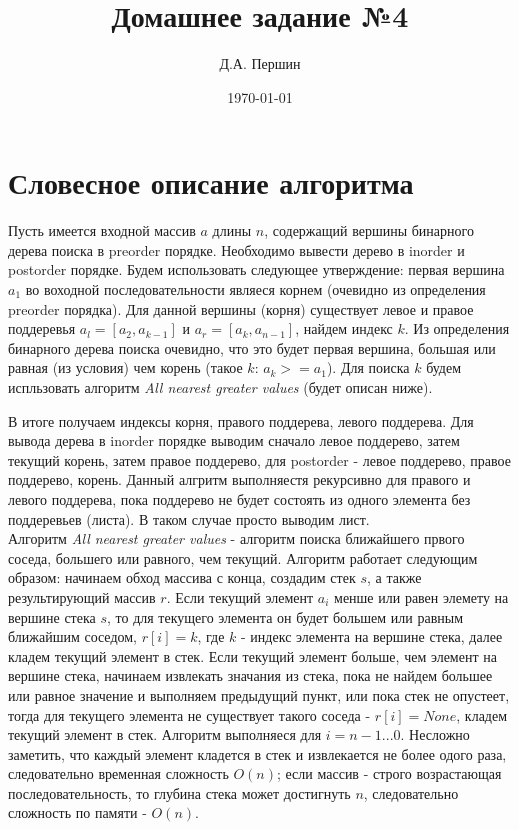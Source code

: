 \documentclass[12pt]{article}
\title{\bf Домашнее задание №4}
\author{Д.А. Першин}
\date{\today}
\begin{document}
\maketitle


\section{Словесное описание алгоритма}

Пусть имеется входной массив $a$ длины $n$, содержащий вершины бинарного дерева поиска в preorder порядке. Необходимо вывести дерево в inorder и postorder порядке. Будем использовать следующее утверждение: первая вершина $a_1$ во воходной последовательности являеся корнем (очевидно из определения preorder порядка). Для данной вершины (корня) существует левое и правое поддеревья $a_l = [a_2,a_{k-1}]$ и $a_r = [a_k, a_{n-1}]$, найдем индекс $k$. Из определения бинарного дерева поиска очевидно, что это будет первая вершина, большая или равная (из условия) чем корень (такое $k$: $a_k >= a_1$). Для поиска $k$ будем испльзовать алгоритм \emph{All nearest greater values} (будет описан ниже).

В итоге получаем индексы корня, правого поддерева, левого поддерева. Для вывода дерева в inorder порядке выводим сначало левое поддерево, затем текущий корень, затем правое поддерево, для postorder - левое поддерево, правое поддерево, корень. Данный алгритм выполняестя рекурсивно для правого и левого поддерева, пока поддерево не будет состоять из одного элемента без поддеревьев (листа). В таком случае просто выводим лист.\\

Алгоритм \emph{All nearest greater values} - алгоритм поиска ближайшего првого соседа, большего или равного, чем текущий. Алгоритм работает следующим образом: начинаем обход массива с конца, создадим стек $s$, а также результирующий массив $r$. Если текущий элемент $a_i$ менше или равен элемету на вершине стека $s$, то для текущего элемента он будет большем или равным ближайшим соседом, $r[i] = k$, где $k$ - индекс элемента на вершине стека, далее кладем текущий элемент в стек. Если текущий элемент больше, чем элемент на вершине стека, начинаем извлекать значания из стека, пока не найдем большее или равное значение и выполняем предыдущий пункт, или пока стек не опустеет, тогда для текущего элемента не существует такого соседа - $r[i] = None$, кладем текущий элемент в стек. Алгоритм выполняеся для $i = n-1...0$.
Несложно заметить, что каждый элемент кладется в стек и извлекается не более одого раза, следовательно временная сложность $O(n)$; если массив - строго возрастающая последовательность, то глубина стека может достигнуть $n$, следовательно сложность по памяти - $O(n)$.
\end{document}
